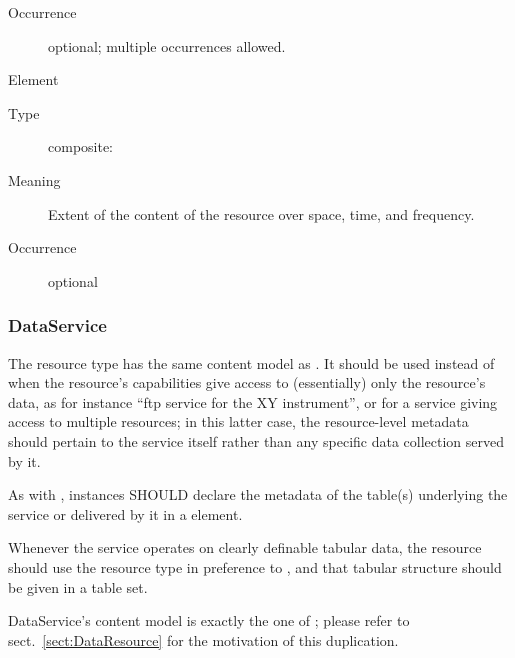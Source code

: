 \documentclass[11pt,a4paper]{ivoa}
\begin{document}
\begin{generated}
\begin{bigdescription}
\begin{description}
\item[Occurrence] optional; multiple occurrences allowed.

\end{description}
\item[Element \xmlel{coverage}]
\begin{description}
\item[Type] composite: 
\item[Meaning] 
                     Extent of the content of the resource over space, time, 
                     and frequency.
                   
\item[Occurrence] optional

\end{description}


\end{bigdescription}\endgroup

\endgroup
\end{generated}


\subsubsection{DataService}

The  resource type has the same content model as
.  It should be used instead of
 when the resource's capabilities give
access to (essentially) only the resource's data, as for instance
``ftp service for the XY instrument'', or for a service giving access
to multiple resources; in this latter case, the resource-level
metadata should pertain to the service itself rather than any specific
data collection served by it.

As with , instances SHOULD
declare the metadata of the table(s) underlying the service or
delivered by it in a  element.

Whenever the service operates on clearly definable tabular
data, the resource should use the  resource type 
in preference to , and that tabular structure
should be given in a table set.

DataService's content model is exactly the one of
; please refer to sect.~\ref{sect:DataResource}
for the motivation of this duplication.
\end{document}
